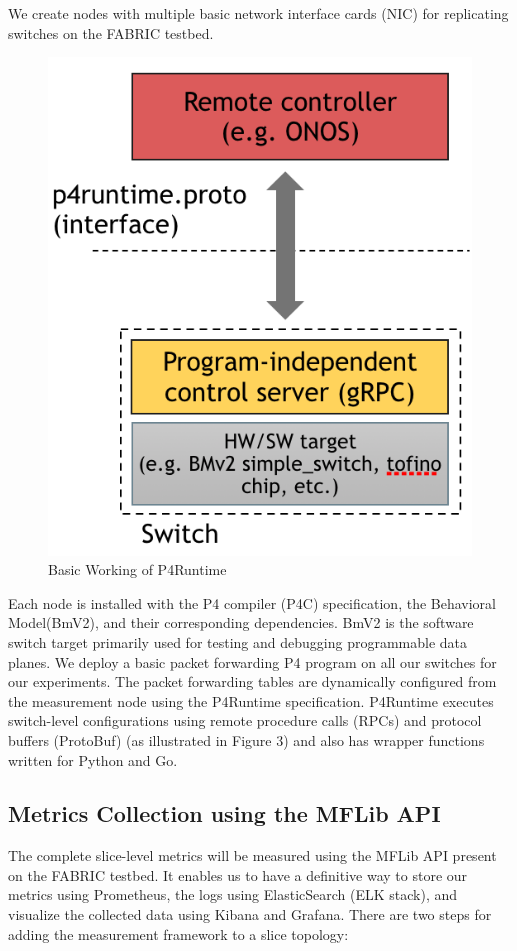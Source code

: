 \documentclass[conference]{IEEEtran}
\begin{document}
     We create nodes with multiple basic network interface cards (NIC) for replicating switches on the FABRIC testbed.
    \begin{figure}[h!]
            \includegraphics[scale=0.2]{P4Runtime.png}
            \centering
            \caption{Basic Working of P4Runtime}
    \end{figure}
    Each node is installed with the P4 compiler (P4C) specification, the Behavioral Model(BmV2), and their corresponding dependencies. BmV2 is the software switch target primarily used for testing and debugging programmable data planes. We deploy a basic packet forwarding P4 program on all our switches for our experiments. The packet forwarding tables are dynamically configured from the measurement node using the P4Runtime specification. P4Runtime executes switch-level configurations using remote procedure calls (RPCs) and protocol buffers (ProtoBuf) (as illustrated in Figure 3) and also has wrapper functions written for Python and Go.


        \subsection{Metrics Collection using the MFLib API}
    The complete slice-level metrics will be measured using the MFLib API present on the FABRIC testbed. It enables us to have a definitive way to store our metrics using Prometheus, the logs using ElasticSearch (ELK stack), and visualize the collected data using Kibana and Grafana. There are two steps for adding the measurement framework to a slice topology:
\end{document}
